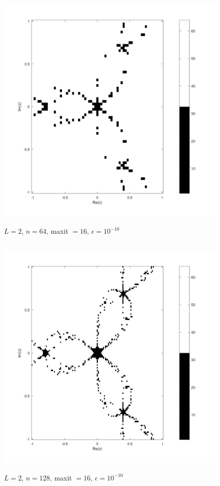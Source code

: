 \documentclass{article} %
\begin{document}
\begin{figure}[H]
    \centering
    \includegraphics[width=152mm, height=120mm]{images/L2n64maxit16e10-10.png}
    \caption{$L=2$, $n=64$, maxit $=16$, $\epsilon=10^{-10}$}
\end{figure}

\begin{figure}[H]
    \centering
    \includegraphics[width=152mm, height=120mm]{images/L2n128maxit16e10-10.png}
    \caption{$L=2$, $n=128$, maxit $=16$, $\epsilon=10^{-10}$}
\end{figure}
\end{document}
